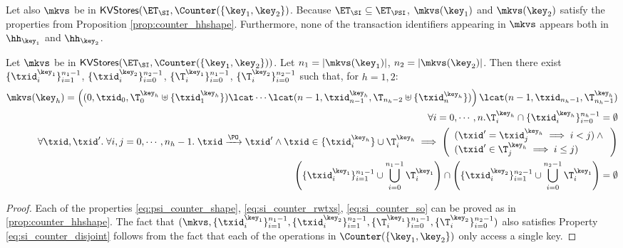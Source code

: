Let also $\mkvs$ be in $\mathsf{KVStores}(\ET_{\SI}, \Counter(\{\key_1, \key_2\})$. Because 
$\ET_{\SI} \subseteq \ET_{\PSI}$, $\mkvs(\key_1)$ and $\mkvs(\key_2)$ satisfy the 
properties from Proposition \ref{prop:counter_hhshape}. 
Furthermore, none of the transaction identifiers appearing in $\mkvs$ appears 
both in $\hh_{\key_1}$ and $\hh_{\key_2}$.
\begin{proposition}
\label{prop:si_counter_hhshape1}
Let $\mkvs$ be in $\mathsf{KVStores}(\ET_{\SI}, \Counter(\{\key_1, \key_2\}))$. 
Let $n_1 = \lvert \mkvs(\key_1) \rvert$, $n_2 = \lvert \mkvs(\key_2) \rvert$. 
Then there exist $\{\txid_{i}^{\key_1}\}_{i=1}^{n_1 - 1}$, $\{\txid_{i}^{\key_2}\}_{i=0}^{n_2 - 1}$, 
$\{\T_{i}^{\key_1}\}_{i=0}^{n_1-1}$, $\{\T_{i}^{\key_2}\}_{i=0}^{n_2 - 1}$ such that, 
for $h = 1,2$: 
\begin{align}
\mkvs(\key_{h}) = \left( (0, \txid_{0}, \T^{\key_{h}}_{0} \uplus \{\txid^{\key_{h}}_1\}) \lcat \cdots \lcat (n-1, \txid^{\key_{h}}_{n-1}, \T_{n_{h}-2} \uplus \{\txid^{\key_{h}}_{n}\}) \right) 
\lcat (n-1, \txid_{n_{h} - 1}, \T^{\key_{h}}_{n_{h} - 1}) \label{eq:si_counter_shape}\\
\forall i=0,\cdots,n.\T^{\key_{h}}_{i} \cap \{\txid^{\key_{h}}_{i}\}_{i=0}^{n_{h}-1} = \emptyset \label{eq:si_counter_rwtxs}\\
\forall \txid, \txid'.\;\forall i,j=0,\cdots, n_{h} - 1.\; \txid \xrightarrow{\PO} \txid' 
\wedge \txid \in \{\txid^{\key_{h}}_{i}\} \cup \T^{\key_{h}}_{i} \implies 
\left(\begin{array}{l}
(\txid' = \txid^{\key_{h}}_{j} \implies i < j) \wedge {} \\
(\txid' \in \T^{\key_{h}}_{j} \implies i \leq j) \\
\end{array}\right) \label{eq:si_counter_so}\\
\left( \{\txid^{\key_{1}}_{i}\}_{i=1}^{n_1 -1} \cup \bigcup_{i=0}^{n_1 - 1} \T_{i}^{\key_1} \right) \cap 
\left( \{\txid^{\key_{2}}_{i}\}_{i=1}^{n_2 -1} \cup \bigcup_{i=0}^{n_2 - 1} \T_{i}^{\key_1} \right) = \emptyset \label{eq:si_counter_disjoint}
\end{align}

\end{proposition}

\begin{proof}
Each of the properties \eqref{eq:psi_counter_shape}, \eqref{eq:si_counter_rwtxs}, \eqref{eq:si_counter_so} 
can be proved as in \cref{prop:counter_hhshape}. The fact that $(\mkvs, \{\txid_{i}^{\key_{1}}\}_{i=1}^{n_1 - 1}, \{\txid^{\key_2}_{i}\}_{i=1}^{n_2 - 1}, 
\{\T_{i}^{\key_1}\}_{i=0}^{n_1 - 1}, \{\T_{i}^{\key_2}\}_{i=0}^{n_2-1})$ also satisfies Property \eqref{eq:si_counter_disjoint} 
follows from the fact that each of the operations in $\Counter(\{\key_1, \key_2\})$ only access a single key. 
\end{proof}

